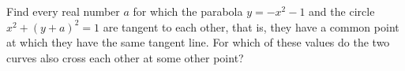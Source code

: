 Find every real number $a$ for which the parabola $y=-x^2-1$ and the circle $x^2+(y+a)^2=1$ are tangent to each other, that is, they have a common point at which they have the same tangent line. For which of these values do the two curves also cross each other at some other point?
